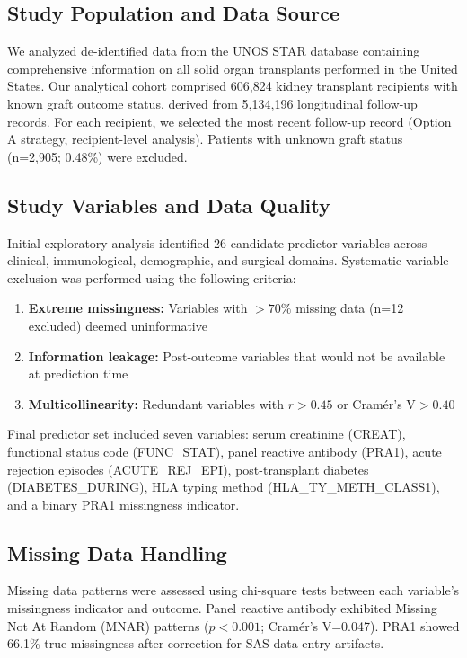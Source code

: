 \documentclass[11pt,a4paper]{article}
\begin{document}
\subsection{Study Population and Data Source}

We analyzed de-identified data from the UNOS STAR database containing comprehensive information on all solid organ transplants performed in the United States. Our analytical cohort comprised 606,824 kidney transplant recipients with known graft outcome status, derived from 5,134,196 longitudinal follow-up records. For each recipient, we selected the most recent follow-up record (Option A strategy, recipient-level analysis). Patients with unknown graft status (n=2,905; 0.48\%) were excluded.

\subsection{Study Variables and Data Quality}

Initial exploratory analysis identified 26 candidate predictor variables across clinical, immunological, demographic, and surgical domains. Systematic variable exclusion was performed using the following criteria:

\begin{enumerate}
    \item \textbf{Extreme missingness:} Variables with $>70\%$ missing data (n=12 excluded) deemed uninformative
    \item \textbf{Information leakage:} Post-outcome variables that would not be available at prediction time 
    \item \textbf{Multicollinearity:} Redundant variables with $r>0.45$ or Cramér's V$>0.40$
\end{enumerate}

Final predictor set included seven variables: serum creatinine (CREAT), functional status code (FUNC\_STAT), panel reactive antibody (PRA1), acute rejection episodes (ACUTE\_REJ\_EPI), post-transplant diabetes (DIABETES\_DURING), HLA typing method (HLA\_TY\_METH\_CLASS1), and a binary PRA1 missingness indicator.

\subsection{Missing Data Handling}

Missing data patterns were assessed using chi-square tests between each variable's missingness indicator and outcome. Panel reactive antibody exhibited Missing Not At Random (MNAR) patterns ($p<0.001$; Cramér's V=0.047). PRA1 showed 66.1\% true missingness after correction for SAS data entry artifacts. 
\end{document}
